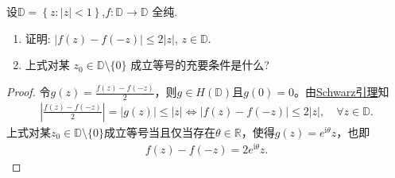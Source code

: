 \documentclass[../../main.tex]{subfiles}%
\begin{document}
\begin{example}
设$\mathbb{D} =\left\{ z:\left| z \right|<1 \right\}$,$f:\mathbb{D}\to\mathbb{D}$ 全纯.
\begin{enumerate}[(1)]
\item 证明: $|f(z)-f(-z)|\leqslant 2|z|$, $z\in\mathbb{D}$.
\item 上式对某 $z_0\in\mathbb{D}\setminus\{0\}$ 成立等号的充要条件是什么?
\end{enumerate}
\end{example}
\begin{proof}

令$g(z)=\frac{f(z)-f(-z)}{2}$，则$g\in H(\mathbb{D})$且$g(0)=0$。由\hyperref[theorem:Schwarz引理-定理4.5.3]{Schwarz引理}知
\begin{align*}
\left|\frac{f(z)-f(-z)}{2}\right|=|g(z)|\leqslant |z|\Longleftrightarrow |f(z)-f(-z)|\leqslant 2|z|,\quad \forall z\in\mathbb{D}.
\end{align*}
上式对某$z_0\in\mathbb{D}\setminus\{0\}$成立等号当且仅当存在$\theta\in\mathbb{R}$，使得$g(z)=e^{\mathrm{i}\theta}z$，也即
\begin{align*}
f(z)-f(-z)=2e^{\mathrm{i}\theta}z.
\end{align*}

\end{proof}
\end{document}
